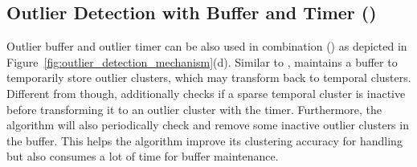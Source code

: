 \subsection{Outlier Detection with Buffer and Timer (\buffertimer)}
\label{subsec:buffertimer}
Outlier buffer and outlier timer can be also used in combination (\buffertimer) as depicted in Figure~\ref{fig:outlier_detection_mechanism}(d).
Similar to \buffer, \buffertimer maintains a buffer to temporarily store outlier clusters, which may transform back to temporal clusters. Different from \buffer though, \buffertimer additionally checks if a sparse temporal cluster is inactive before transforming it to an outlier cluster with the timer. Furthermore, the algorithm will also periodically check and remove some inactive outlier clusters in the buffer. This helps the algorithm improve its clustering accuracy for handling \oef but also consumes a lot of time for buffer maintenance.



